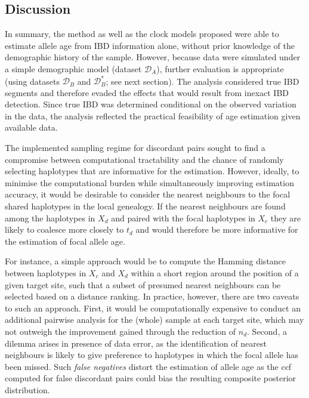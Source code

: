 

%
\subsection{Discussion}
%


In summary, the method as well as the clock models proposed were able to estimate allele age from IBD information alone, without prior knowledge of the demographic history of the sample.
However, because data were simulated under a simple demographic model (dataset $\mathcal{D}_A$), further evaluation is appropriate (\eg using datasets $\mathcal{D}_B$ and $\mathcal{D}_B^{\ast}$; see next section).
The analysis considered true IBD segments and therefore evaded the effects that would result from inexact IBD detection.
Since true IBD was determined conditional on the observed variation in the data, the analysis reflected the practical feasibility of age estimation given available data.


The implemented sampling regime for discordant pairs sought to find a compromise between computational tractability and the chance of randomly selecting haplotypes that are informative for the estimation.
However, ideally, to minimise the computational burden while simultaneously improving estimation accuracy, it would be desirable to consider the nearest neighbours to the focal shared haplotypes in the local genealogy.
If the nearest neighbours are found among the haplotypes in $X_d$ and paired with the focal haplotypes in $X_c$ they are likely to coalesce more closely to $t_d$ and would therefore be more informative for the estimation of focal allele age.

For instance, a simple approach would be to compute the Hamming distance between haplotypes in $X_c$ and $X_d$ within a short region around the position of a given target site, such that a subset of presumed nearest neighbours can be selected based on a distance ranking.
In practice, however, there are two caveats to such an approach.
First, it would be computationally expensive to conduct an additional pairwise analysis for the (whole) sample at each target site, which may not outweigh the improvement gained through the reduction of $n_d$.
Second, a dilemma arises in presence of data error, as the identification of nearest neighbours is likely to give preference to haplotypes in which the focal allele has been missed.
\label{p:falseneg}%
Such \emph{false negatives} distort the estimation of allele age as the \gls{ccf}
computed for false discordant pairs could bias the resulting composite posterior distribution.

